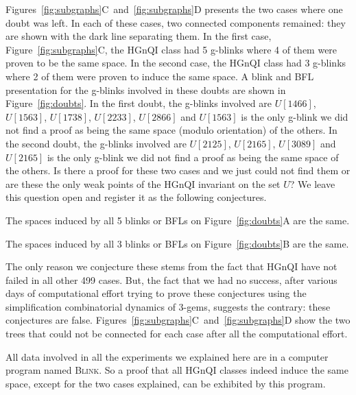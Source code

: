 Figures~\ref{fig:subgraphs}C~and~\ref{fig:subgraphs}D presents the
two cases where one doubt was left. In each of these cases, two
connected components remained: they are shown with the dark line
separating them. In the first case, Figure~\ref{fig:subgraphs}C, the
HGnQI class had 5 g-blinks where 4 of them were proven to be the
same space. In the second case, the HGnQI class had 3 g-blinks where
2 of them were proven to induce the same space. A blink and BFL
presentation for the g-blinks involved in these doubts are shown in
Figure~\ref{fig:doubts}. In the first doubt, the g-blinks involved
are $U[1466]$, $U[1563]$, $U[1738]$, $U[2233]$, $U[2866]$ and
$U[1563]$ is the only g-blink we did not find a proof as being the
same space (modulo orientation) of the others. In the second doubt,
the g-blinks involved are $U[2125]$, $U[2165]$, $U[3089]$ and
 $U[2165]$ is the only g-blink we did not find a proof as
being the same space of the others. Is there a proof for these
two cases and we just could not find them or are these the only
weak points of the HGnQI invariant on the set $U$? We leave
this question open and register it as the following conjectures.

\begin{conjecture} \label{conj:conjecture1}
The spaces induced by all 5 blinks or BFLs on Figure~\ref{fig:doubts}A
are the same.
\end{conjecture}

\begin{conjecture} \label{conj:conjecture2}
The spaces induced by all 3 blinks or BFLs on Figure~\ref{fig:doubts}B
are the same.
\end{conjecture}

The only reason we conjecture these stems from the fact that
HGnQI have not failed in all other 499 cases. But,
the fact that we had no success, after various days of
computational effort trying to prove these conjectures
using the simplification combinatorial dynamics of 3-gems,
suggests the contrary: these conjectures are false.
Figures~\ref{fig:subgraphs}C~and~\ref{fig:subgraphs}D show the
two trees that could not be connected for
each case after all the computational effort.

All data involved in all the experiments we explained here are in a computer program named
\textsc{Blink}. So a proof that all HGnQI classes indeed induce the same space,
except for the two cases explained, can be exhibited by this program.

